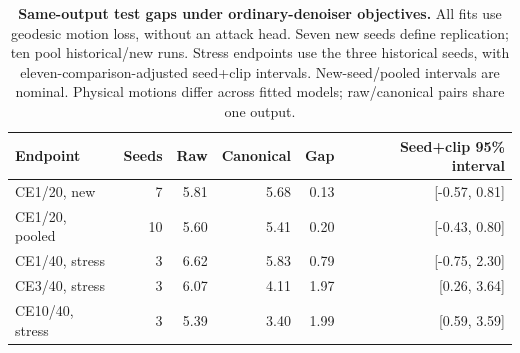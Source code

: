 \begin{table}[t]\centering\small
\caption{\textbf{Same-output test gaps under ordinary-denoiser objectives.} All fits use geodesic motion loss, without an attack head. Seven new seeds define replication; ten pool historical/new runs. Stress endpoints use the three historical seeds, with eleven-comparison-adjusted seed+clip intervals. New-seed/pooled intervals are nominal. Physical motions differ across fitted models; raw/canonical pairs share one output.}
\label{tab:ordinaryreplication}
\begin{tabular}{lrrrrr}\toprule
Endpoint & Seeds & Raw & Canonical & Gap & Seed+clip 95\% interval\\\midrule
CE1/20, new & 7 & 5.81 & 5.68 & 0.13 & [-0.57, 0.81]\\
CE1/20, pooled & 10 & 5.60 & 5.41 & 0.20 & [-0.43, 0.80]\\
CE1/40, stress & 3 & 6.62 & 5.83 & 0.79 & [-0.75, 2.30]\\
CE3/40, stress & 3 & 6.07 & 4.11 & 1.97 & [0.26, 3.64]\\
CE10/40, stress & 3 & 5.39 & 3.40 & 1.99 & [0.59, 3.59]\\
\bottomrule\end{tabular}\end{table}
